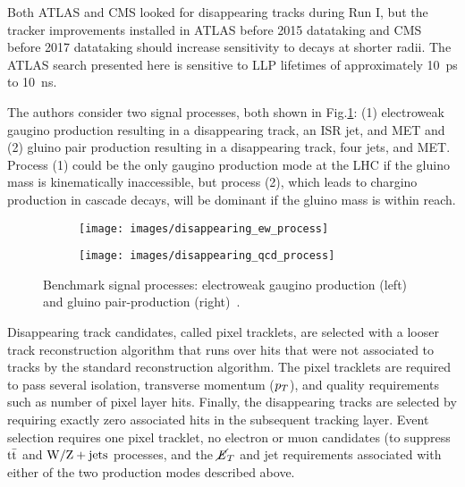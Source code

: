 \documentclass[12pt]{article}
\begin{document}
        Both ATLAS and CMS looked for disappearing tracks during Run I, but the tracker improvements installed in ATLAS before 2015 datataking and CMS before 2017 datataking should increase sensitivity to decays at shorter radii. The ATLAS search presented here is sensitive to LLP lifetimes of approximately \SI{10}{\pico\s} to \SI{10}{\nano\s}.

        The authors consider two signal processes, both shown in Fig.\ref{disappearing_processes}: (1) electroweak gaugino production resulting in a disappearing track, an ISR jet, and MET and (2) gluino pair production resulting in a disappearing track, four jets, and MET. Process (1) could be the only gaugino production mode at the LHC if the gluino mass is kinematically inaccessible, but process (2), which leads to chargino production in cascade decays, will be dominant if the gluino mass is within reach.

        \noindent \begin{figure}[htbp] \begin{center}
        \begin{subfigure}[htbp]{0.2\textwidth} \begin{center}
        \texttt{[image: images/disappearing\_ew\_process]}
        \end{center} \end{subfigure}
        \qquad
        \begin{subfigure}[htbp]{0.2\textwidth} \begin{center}
        \texttt{[image: images/disappearing\_qcd\_process]}
        \end{center} \end{subfigure}
        \caption{Benchmark signal processes: electroweak gaugino production (left) and gluino pair-production (right)~\cite{atlas_disappearing}.}
        \label{disappearing_processes}
        \end{center} \end{figure}

        Disappearing track candidates, called pixel tracklets, are selected with a looser track reconstruction algorithm that runs over hits that were not associated to tracks by the standard reconstruction algorithm. The pixel tracklets are required to pass several isolation, transverse momentum ($p_T$), and quality requirements such as number of pixel layer hits. Finally, the disappearing tracks are selected by requiring exactly zero associated hits in the subsequent tracking layer. Event selection requires one pixel tracklet, no electron or muon candidates (to suppress $\mathrm{t}\bar{\mathrm{t}}$ and $\mathrm{W}/\mathrm{Z} + \mathrm{jets}$ processes, and the $\cancel{\it{E}}_{T}$ and jet requirements associated with either of the two production modes described above.
\end{document}

